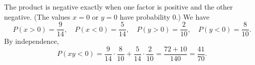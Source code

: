The product is negative exactly when one factor is positive and the other negative. (The values $x=0$ or $y=0$ have probability $0$.) We have
\[P(x>0)=\dfrac{9}{14},\quad P(x<0)=\dfrac5{14},\quad P(y>0)=\dfrac{2}{10},\quad P(y<0)=\dfrac{8}{10}.\]
By independence,
\[P(xy<0)=\dfrac9{14}\cdot\dfrac{8}{10}+\dfrac5{14}\cdot\dfrac2{10}=\dfrac{72+10}{140}=\boxed{\dfrac{41}{70}}.\]
